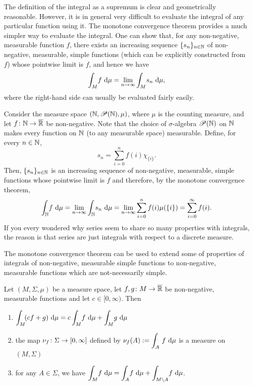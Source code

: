 The definition of the integral as a supremum is clear and geometrically reasonable. However, it is in general very difficult to evaluate
the integral of any particular function using it. The monotone convergence theorem provides a much simpler way to evaluate the integral. One can show that, for any non-negative, measurable function $f$, there exists an increasing sequence $\{s_n\}_{n\in\mathbb{N}}$ of non-negative, measurable, simple functions (which can be explicitly constructed from $f$) whose pointwise limit is $f$, and hence we have
\begin{equation*}
\int_M\! f \, \mathop{}\!\mathrm{d} \mu = \lim_{n\to\infty}\int_M\! s_n \, \mathop{}\!\mathrm{d} \mu,
\end{equation*}
where the right-hand side can usually be evaluated fairly easily.

\begin{example}
Consider the measure space $(\mathbb{N},\mathscr{P}(\mathbb{N}),\mu)$, where $\mu$ is the counting measure, and let $f\colon \mathbb{N} \to \overline{\mathbb{R}}$ be non-negative. Note that the choice of $\sigma$-algebra $\mathscr{P}(\mathbb{N})$ on $\mathbb{N}$ makes every function on $\mathbb{N}$ (to any measurable space) measurable. Define, for every $n\in \mathbb{N}$,  
\begin{equation*}
s_n=\sum_{i=0}^nf(i)\chi_{\{i\}}.
\end{equation*}
Then, $\{s_n\}_{n\in\mathbb{N}}$ is an increasing sequence of non-negative, measurable, simple functions whose pointwise limit is $f$ and therefore, by the monotone convergence theorem,
\begin{equation*}
\int_{\mathbb{N}}\! f \,\mathop{}\!\mathrm{d} \mu =\lim_{n\to\infty}\int_{\mathbb{N}}\! s_n \, \mathop{}\!\mathrm{d} \mu = \lim_{n\to\infty}\sum_{i=0}^nf(i)\mu(\{i\}) = \sum_{i=0}^{\infty}f(i).
\end{equation*}
If you every wondered why series seem to share so many properties with integrals, the reason is that series are just integrals with respect to a discrete measure.
\end{example}

The monotone convergence theorem can be used to extend some of properties of integrals of non-negative, measurable simple functions to non-negative, measurable functions which are not-necessarily simple.

\begin{lemma}
Let $(M,\Sigma,\mu)$ be a measure space, let $f,g\colon M\to \overline{\mathbb{R}}$ be non-negative, measurable functions and let $c\in [0,\infty)$. Then
\begin{enumerate}[label=(\roman*)]
\item $\displaystyle \int_{M}\! (cf+g) \,\mathop{}\!\mathrm{d} \mu = c\int_{M}\! f \,\mathop{}\!\mathrm{d} \mu +\int_{M}\! g \,\mathop{}\!\mathrm{d} \mu $
\item the map $\nu_f\colon \Sigma\to [0,\infty]$ defined by $\displaystyle \nu_f(A):=\int_A\, f\, \mathop{}\!\mathrm{d} \mu$ is a measure on $(M,\Sigma)$
\item for any $A\in\Sigma$, we have $\displaystyle \int_{M}\!f \,\mathop{}\!\mathrm{d} \mu =  \int_{A}\!f \,\mathop{}\!\mathrm{d} \mu+ \int_{M\setminus A}\!f \,\mathop{}\!\mathrm{d} \mu$.
\end{enumerate}
\end{lemma}

